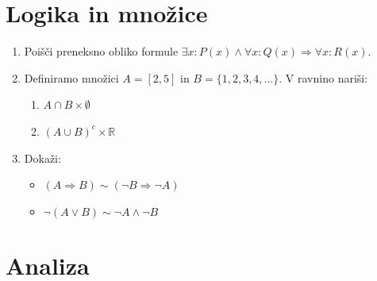 \documentclass[a4paper,12pt]{article}
\begin{document}

\section*{Logika in množice}

\begin{enumerate}
\item
Poišči preneksno obliko formule \(\exists x : P(x) \land \forall x : Q(x) \Rightarrow \forall x : R(x)\).

\item
Definiramo množici \(A= [2, 5]\) in \(B=\{1,2,3,4,\ldots\}\).
V ravnino nariši:
\begin{enumerate}
\item \(A \cap B \times \emptyset\)
\item \((A \cup B)^c \times \mathbb{R}\)
\end{enumerate}

\item
Dokaži:
\begin{itemize}
\item \((A \Rightarrow B)\sim(\neg B \Rightarrow \neg A)\)
\item \(\neg (A \lor B)\sim \neg A \land \neg B\)
\end{itemize}
\end{enumerate}

\section*{Analiza}
\end{document}
